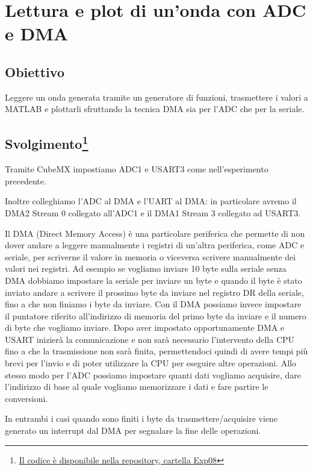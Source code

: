 \chapter{Lettura e plot di un'onda con ADC e DMA}

\section*{Obiettivo}
Leggere un onda generata tramite un generatore di funzioni, trasmettere i valori a MATLAB e plottarli sfruttando la tecnica DMA sia per l'ADC che per la seriale.

\section*{Svolgimento\footnote{\href{https://github.com/fdila/electronics-experimentation/tree/main/Exp08}{Il codice è disponibile nella repository, cartella Exp08}}}

Tramite CubeMX impostiamo ADC1 e USART3 come nell'esperimento precedente.

Inoltre colleghiamo l'ADC al DMA e l'UART al DMA: in particolare avremo il DMA2 Stream 0 collegato all'ADC1 e il DMA1 Stream 3 collegato ad USART3.

Il DMA (Direct Memory Access) è una particolare periferica che permette di non dover andare a leggere manualmente i registri di un'altra periferica, come ADC e seriale, per scriverne il valore in memoria o viceversa scrivere manualmente dei valori nei registri.
Ad esempio se vogliamo inviare 10 byte sulla seriale senza DMA dobbiamo impostare la seriale per inviare un byte e quando il byte è stato inviato andare a scrivere il prossimo byte da inviare nel registro DR della seriale, fino a che non finiamo i byte da inviare.
Con il DMA possiamo invece impostare il puntatore riferito all'indirizzo di memoria del primo byte da inviare e il numero di byte che vogliamo inviare. Dopo aver impostato opportunamente DMA e USART inizierà la comunicazione e non sarà necessario l'intervento della CPU fino a che la trasmissione non sarà finita, permettendoci quindi di avere tempi più brevi per l'invio e di poter utilizzare la CPU per eseguire altre operazioni.
Allo stesso modo per l'ADC possiamo impostare quanti dati vogliamo acquisire, dare l'indirizzo di base al quale vogliamo memorizzare i dati e fare partire le conversioni.

In entrambi i casi quando sono finiti i byte da trasmettere/acquisire viene generato un interrupt dal DMA per segnalare la fine delle operazioni.

